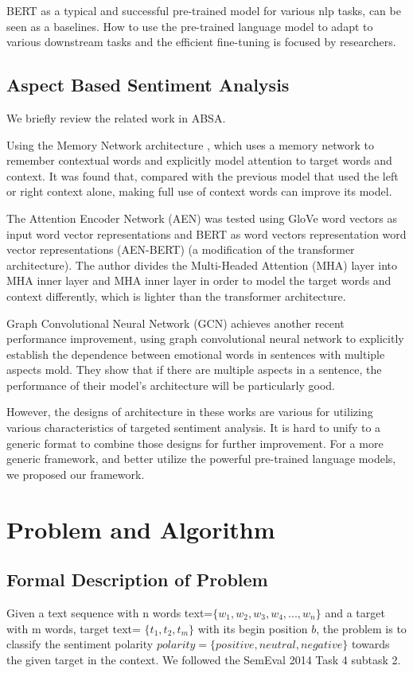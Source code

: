 \documentclass[fyp]{socreport}
\begin{document}
BERT \cite{devlinBERTPretrainingDeep2019} as a typical and successful pre-trained model for various nlp tasks, can be seen as a baselines.  How to use the pre-trained language model to adapt to various downstream tasks and the efficient fine-tuning is focused by researchers.

\section{Aspect Based Sentiment Analysis}
We briefly review the related work in ABSA.

Using the Memory Network architecture \cite {Tang2016}, which uses a memory network to remember contextual words and explicitly model attention to target words and context.
It was found that, compared with the previous model \cite {Tang2015} that used the left or right context alone, making full use of context words can improve its model.

The Attention Encoder Network (AEN) \cite {ArxSong} was tested using GloVe word vectors as input word vector representations and BERT as word vectors representation word vector representations (AEN-BERT) (a modification of the transformer architecture). The author divides the Multi-Headed Attention (MHA) layer into MHA inner layer and MHA inner layer in order to model the target words and context differently, which is lighter than the transformer architecture.

Graph Convolutional Neural Network (GCN) \cite {ArxZhaoa2019} achieves another recent performance improvement, using graph convolutional neural network to explicitly establish the dependence between emotional words in sentences with multiple aspects mold. They show that if there are multiple aspects in a sentence, the performance of their model's architecture will be particularly good.

However, the designs of architecture in these works are various for utilizing various characteristics of targeted sentiment analysis. It is hard to unify to a generic format to combine those designs for further improvement. For a more generic framework, and better utilize the powerful pre-trained language models, we proposed our framework.




\chapter{Problem and Algorithm}
\section{Formal Description of Problem}
Given a text sequence with n words text=$\{w_1,w_2,w_3,w_4,...,w_n\}$ and a target with m words, target text=  $\{t_1,t_2,t_m\}$ with its begin position $b$, the problem is to classify the sentiment polarity $polarity=\{positive,neutral,negative\}$ towards the given target in the context. We followed the SemEval 2014 Task 4\cite{pontiki-etal-2014-semeval} subtask 2.
\end{document}
